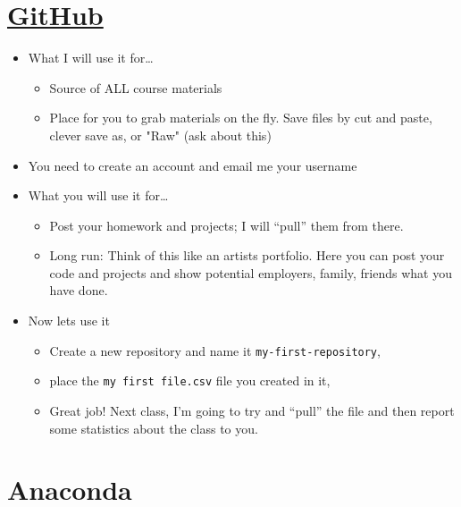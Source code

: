 \section*{\href{https://github.com}{GitHub}}
\begin{itemize}
\item What I will use it for\ldots
\begin{itemize}
\item Source of ALL course materials
\item Place for you to grab materials on the fly. Save files by cut and paste, clever save as, or "Raw" (ask about this)
\end{itemize}
\item You need to create an account and email me your username
\item What you will use it for\ldots
\begin{itemize}
\item Post your homework and projects; I will ``pull'' them from there.
\item Long run: Think of this like an artists portfolio. Here you can post your code and projects and show potential employers, family, friends what you have done.
\end{itemize}
\item Now lets use it
\begin{itemize}
\item Create a new repository and name it {\tt my-first-repository},
\item place the {\tt my first file.csv} file you created in it,
\item Great job! Next class, I'm going to try and ``pull'' the file and then report some statistics about the class to you.
\end{itemize}
\end{itemize}


\section*{Anaconda}

